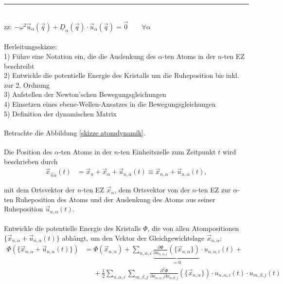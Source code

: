 \documentclass{article}
\begin{document}
{\color{violet}
\hrule
	\\
	zz: $-\omega^2 \vec{u}_\alpha(\vec{q}) + \underline{D}_\alpha(\vec{q}) \cdot \vec{u}_\alpha(\vec{q}) = \vec{0} \qquad \forall\alpha$\\
	\\
	Herleitungsskizze:\\
	1) Führe eine Notation ein, die die Auslenkung des $\alpha$-ten Atoms in der $n$-ten EZ beschreibt\\
	2) Entwickle die potentielle Energie des Kristalls um die Ruheposition bis inkl. zur 2. Ordnung\\
	3) Aufstellen der Newton'schen Bewegungsgleichungen\\
	4) Einsetzen eines ebene-Wellen-Ansatzes in die Bewegungsgleichungen\\
	5) Definition der dynamischen Matrix\\
	\\
	Betrachte die Abbildung \ref{skizze atomdynamik}.\\
	\\
	Die Position des $\alpha$-ten Atoms in der $n$-ten Einheitszelle zum Zeitpunkt $t$ wird beschrieben durch
		\begin{align*}
			\vec{x}_{\vec{n}\alpha}(t) &= \vec{x}_n + \vec{x}_\alpha + \vec{u}_{n,\alpha}(t) \equiv \vec{x}_{n,\alpha} + \vec{u}_{n,\alpha}(t),
		\end{align*}
		
	mit dem Ortsvektor der $n$-ten EZ $\vec{x}_n$, dem Ortsvektor von der $n$-ten EZ zur $\alpha$-ten Ruheposition des Atoms und der Auslenkung des Atoms aus seiner Ruheposition $\vec{u}_{n,\alpha}(t)$.\\
	\\
	Entwickle die potentielle Energie des Kristalls $\Phi$, die von allen Atompositionen $\{\vec{x}_{n,\alpha} + \vec{u}_{n,\alpha}(t)\}$ abhängt, um den Vektor der Gleichgewichtslage $\vec{x}_{n,\alpha}$:
		\begin{align*}
			\Phi(\{ \vec{x}_{n,\alpha}+\vec{u}_{n,\alpha}(t) \}) &= \Phi( \vec{x}_{n,\alpha} ) + \sum_{n,\alpha,i} \underbrace{ \frac{\partial \Phi}{\partial x_{n,\alpha,i}} (\{ \vec{x}_{n,\alpha} \}) }_{=0} \cdot u_{n,\alpha,i}(t) + \\
			&\phantom{=} + \frac{1}{2} \sum_{n,\alpha,i} \sum_{m,\beta,j} \frac{ \partial^2 \Phi }{ \partial x_{n,\alpha,i} \partial x_{n,\beta,j} }(\{ \vec{x}_{n,\alpha}\}) \cdot u_{n,\alpha,i}(t) \cdot u_{m,\beta,j}(t)
		\end{align*}

}
\end{document}
